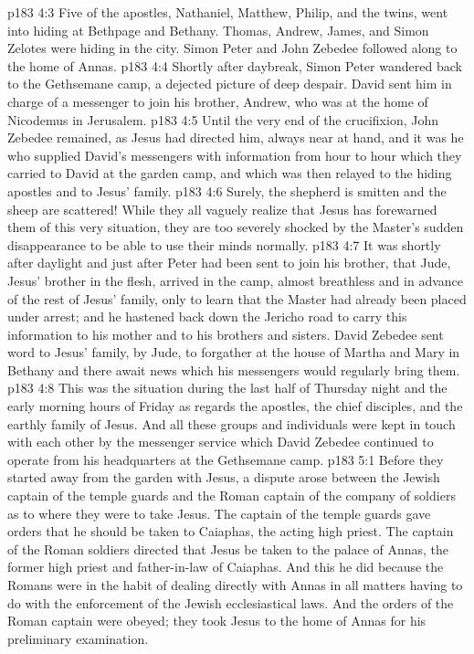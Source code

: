 \vs p183 4:3 Five of the apostles, Nathaniel, Matthew, Philip, and the twins, went into hiding at Bethpage and Bethany. Thomas, Andrew, James, and Simon Zelotes were hiding in the city. Simon Peter and John Zebedee followed along to the home of Annas.
\vs p183 4:4 Shortly after daybreak, Simon Peter wandered back to the Gethsemane camp, a dejected picture of deep despair. David sent him in charge of a messenger to join his brother, Andrew, who was at the home of Nicodemus in Jerusalem.
\vs p183 4:5 Until the very end of the crucifixion, John Zebedee remained, as Jesus had directed him, always near at hand, and it was he who supplied David’s messengers with information from hour to hour which they carried to David at the garden camp, and which was then relayed to the hiding apostles and to Jesus’ family.
\vs p183 4:6 Surely, the shepherd is smitten and the sheep are scattered! While they all vaguely realize that Jesus has forewarned them of this very situation, they are too severely shocked by the Master’s sudden disappearance to be able to use their minds normally.
\vs p183 4:7 It was shortly after daylight and just after Peter had been sent to join his brother, that Jude, Jesus’ brother in the flesh, arrived in the camp, almost breathless and in advance of the rest of Jesus’ family, only to learn that the Master had already been placed under arrest; and he hastened back down the Jericho road to carry this information to his mother and to his brothers and sisters. David Zebedee sent word to Jesus’ family, by Jude, to forgather at the house of Martha and Mary in Bethany and there await news which his messengers would regularly bring them.
\vs p183 4:8 This was the situation during the last half of Thursday night and the early morning hours of Friday as regards the apostles, the chief disciples, and the earthly family of Jesus. And all these groups and individuals were kept in touch with each other by the messenger service which David Zebedee continued to operate from his headquarters at the Gethsemane camp.
\vs p183 5:1 Before they started away from the garden with Jesus, a dispute arose between the Jewish captain of the temple guards and the Roman captain of the company of soldiers as to where they were to take Jesus. The captain of the temple guards gave orders that he should be taken to Caiaphas, the acting high priest. The captain of the Roman soldiers directed that Jesus be taken to the palace of Annas, the former high priest and father\hyp{}in\hyp{}law of Caiaphas. And this he did because the Romans were in the habit of dealing directly with Annas in all matters having to do with the enforcement of the Jewish ecclesiastical laws. And the orders of the Roman captain were obeyed; they took Jesus to the home of Annas for his preliminary examination.
